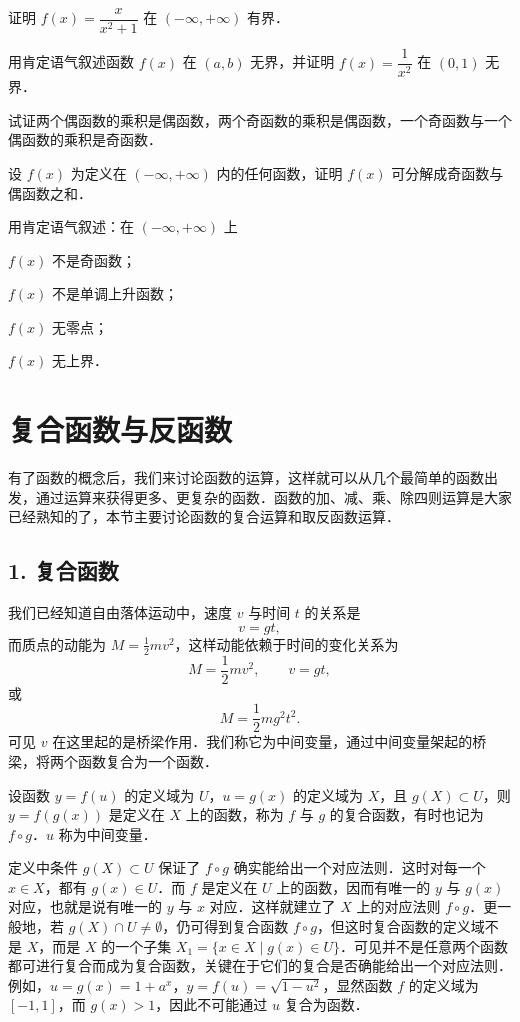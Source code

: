 \begin{xiti}
\item 证明 $f(x)=\dfrac{x}{x^2+1}$ 在 $(-\infty,+\infty)$ 有界．
\item 用肯定语气叙述函数 $f(x)$ 在 $(a,b)$ 无界，并证明 $f(x)=\dfrac{1}{x^2}$ 在 $(0,1)$ 无界．
\item 试证两个偶函数的乘积是偶函数，两个奇函数的乘积是偶函数，一个奇函数与一个偶函数的乘积是奇函数．
\item 设 $f(x)$ 为定义在 $(-\infty,+\infty)$ 内的任何函数，证明 $f(x)$ 可分解成奇函数与偶函数之和．
\item 用肯定语气叙述：在 $(-\infty,+\infty)$ 上
  \begin{ziti}
  \item $f(x)$ 不是奇函数；
  \item $f(x)$ 不是单调上升函数；
  \item $f(x)$ 无零点；
  \item $f(x)$ 无上界．
  \end{ziti}
\end{xiti}

\section{复合函数与反函数}\label{sec:2.2}

有了函数的概念后，我们来讨论函数的运算，这样就可以从几个最简单的函数出发，通过运算来获得更多、更复杂的函数．函数的加、减、乘、除四则运算是大家已经熟知的了，本节主要讨论函数的复合运算和取反函数运算．

\subsection*{1. 复合函数}

我们已经知道自由落体运动中，速度 $v$ 与时间 $t$ 的关系是
\[
v=gt,
\]
而质点的动能为 $M=\frac{1}{2}mv^2$，这样动能依赖于时间的变化关系为
\[
M=\frac{1}{2}mv^2,\qquad v=gt,
\]
或
\[
M=\frac{1}{2}mg^2t^2.
\]
可见 $v$ 在这里起的是桥梁作用．我们称它为中间变量，通过中间变量架起的桥梁，将两个函数复合为一个函数．

\begin{definition}\label{def:2-6}
设函数 $y=f(u)$ 的定义域为 $U$，$u=g(x)$ 的定义域为 $X$，且 $g(X)\subset U$，则 $y=f(g(x))$ 是定义在 $X$ 上的函数，称为 $f$ 与 $g$ 的复合函数，有时也记为 $f\circ g$．$u$ 称为中间变量．
\end{definition}

定义中条件 $g(X)\subset U$ 保证了 $f\circ g$ 确实能给出一个对应法则．这时对每一个 $x\in X$，都有 $g(x)\in U$．而 $f$ 是定义在 $U$ 上的函数，因而有唯一的 $y$ 与 $g(x)$ 对应，也就是说有唯一的 $y$ 与 $x$ 对应．这样就建立了 $X$ 上的对应法则 $f\circ g$．更一般地，若 $g(X)\cap U\neq\emptyset$，仍可得到复合函数 $f\circ g$，但这时复合函数的定义域不是 $X$，而是 $X$ 的一个子集 $X_1=\{x\in X\mid g(x)\in U\}$．可见并不是任意两个函数都可进行复合而成为复合函数，关键在于它们的复合是否确能给出一个对应法则．例如，$u=g(x)=1+a^x$，$y=f(u)=\sqrt{1-u^2}$，显然函数 $f$ 的定义域为 $[-1,1]$，而 $g(x)>1$，因此不可能通过 $u$ 复合为函数．

